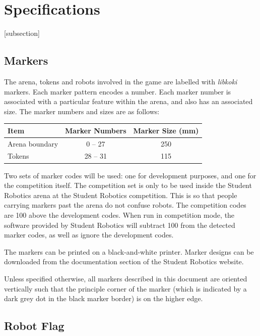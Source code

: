 \section{Specifications}
\label{sec:Specifications}

[subsection]
\newcommand{\rcnii}{\stepcounter{rulei}\arabic{section}.\arabic{subsection}.\arabic{rulei}}
\renewcommand{\labelenumi}{\rcnii}

\subsection{Markers}
\label{sub:markers}
The arena, tokens and robots involved in the game are labelled with \textit{libkoki} markers.
Each marker pattern encodes a number.
Each marker number is associated with a particular feature within the arena, and also has an associated size.
The marker numbers and sizes are as follows:

\begin{center}
  \begin{tabular}{lcc}
    \toprule
    \textbf{Item} & \textbf{Marker Numbers} & \textbf{Marker Size (mm)} \\
    \midrule
    Arena boundary & {} 0 -- 27 & 250 \\
    Tokens & 28 -- 31 & 115 \\
    \bottomrule
  \end{tabular}
\end{center}

Two sets of marker codes will be used: one for development purposes, and one for the competition itself.
The competition set is only to be used inside the Student Robotics arena at the Student Robotics competition.
This is so that people carrying markers past the arena do not confuse robots.
The competition codes are 100 above the development codes.
When run in competition mode, the software provided by Student Robotics will subtract 100 from the detected marker codes, as well as ignore the development codes.

The markers can be printed on a black-and-white printer.
Marker designs can be downloaded from the documentation section of the Student Robotics website.

Unless specified otherwise, all markers described in this document are oriented vertically such that the principle corner of the marker (which is indicated by a dark grey dot in the black marker border) is on the higher edge.

\subsection{Robot Flag}
\label{sub:robot-flag}

